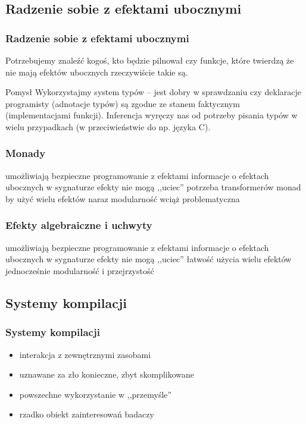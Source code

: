 \documentclass[polish, 13pt]{beamer}
\begin{document}
\subsection{Radzenie sobie z efektami ubocznymi}

\begin{frame}
  \frametitle{Radzenie sobie z efektami ubocznymi}
    Potrzebujemy znaleźć kogoś, kto będzie pilnował czy funkcje, które twierdzą że nie mają efektów ubocznych rzeczywiście takie są.
  \pause
  \begin{exampleblock}{Pomysł}
    Wykorzystajmy system typów -- jest dobry w sprawdzaniu czy deklaracje programisty (adnotacje typów) są zgodne ze stanem faktycznym (implementacjami funkcji). Inferencja wyręczy nas od potrzeby pisania typów w wielu przypadkach (w przeciwieństwie do np. języka C).
  \end{exampleblock}
\end{frame}

\begin{frame}
  \frametitle{Monady}
  \begin{itemize}
  \pro umożliwiają bezpieczne programowanie z efektami
  \pro informacje o efektach ubocznych w sygnaturze
  \pro efekty nie mogą ,,uciec''
  \con potrzeba transformerów monad by użyć wielu efektów naraz
  \con modularność wciąż problematyczna
  \end{itemize}
\end{frame}

\begin{frame}
  \frametitle{Efekty algebraiczne i uchwyty}
  \begin{itemize}
    \pro umożliwiają bezpieczne programowanie z efektami
    \pro informacje o efektach ubocznych w sygnaturze
    \pro efekty nie mogą ,,uciec''
    \pro łatwość użycia wielu efektów jednocześnie
    \pro modularność i przejrzystość
  \end{itemize}
\end{frame}

\subsection{Systemy kompilacji}

\begin{frame}
  \frametitle{Systemy kompilacji}
  \begin{itemize}
  \item interakcja z zewnętrznymi zasobami
  \item uznawane za zło konieczne, zbyt skomplikowane
  \item powszechne wykorzystanie w ,,przemyśle''
  \item rzadko obiekt zainteresowań badaczy
  \end{itemize}
\end{frame}
\end{document}
